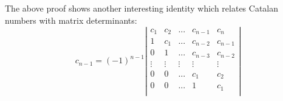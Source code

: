 \quad
\\\\
The above proof shows another interesting identity which relates Catalan
numbers with matrix determinants:
\begin{displaymath}                
    c_{n-1} = (-1)^{n-1}
        \left|
        \begin{array}{ccccc}
            c_1 & c_2 & \ldots & c_{n-1} & c_{n}\\
            1 & c_1 & \ldots & c_{n-2} & c_{n-1}\\
            0   & 1 & \ldots & c_{n-3} & c_{n-2}\\
            \vdots & \vdots & \vdots & \vdots & \vdots\\
            0 & 0 & \ldots & c_{1} & c_{2}\\
            0 & 0 & \ldots & 1 & c_{1}\\
        \end{array}
        \right|
\end{displaymath}                

